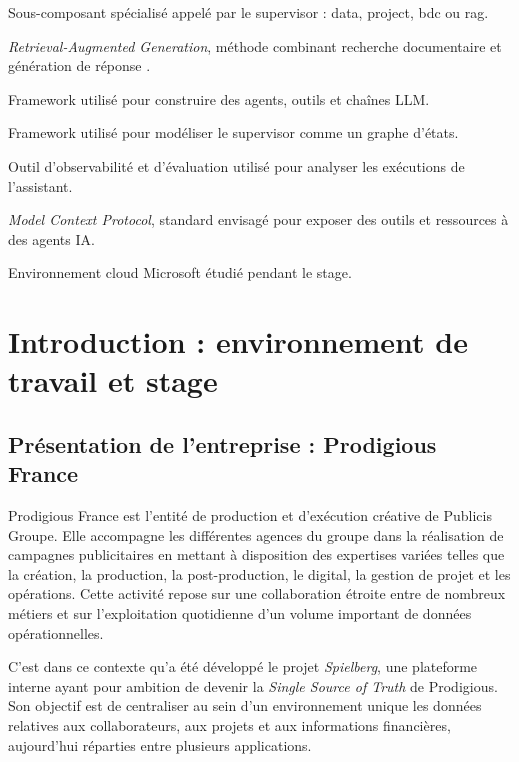 \documentclass[a4paper,11pt,english,openany]{book}
\begin{document}
\begin{description}[leftmargin=3.4cm,style=nextline,itemsep=0.28em,parsep=0pt,topsep=0.3em]
    \item[Worker] Sous-composant spécialisé appelé par le supervisor : data, project, bdc ou rag.
    \item[RAG] \textit{Retrieval-Augmented Generation}, méthode combinant recherche documentaire et génération de réponse \cite{lewis2020rag}.
    \item[LangChain] Framework utilisé pour construire des agents, outils et chaînes LLM.
    \item[LangGraph] Framework utilisé pour modéliser le supervisor comme un graphe d'états.
    \item[LangSmith] Outil d'observabilité et d'évaluation utilisé pour analyser les exécutions de l'assistant.
    \item[MCP] \textit{Model Context Protocol}, standard envisagé pour exposer des outils et ressources à des agents IA.
    \item[Azure] Environnement cloud Microsoft étudié pendant le stage.
\end{description}

\newpage
\listoffigures
{}
\tableofcontents
\newpage
{}

\chapter{Introduction : environnement de travail et stage}

\section{Présentation de l'entreprise : Prodigious France}

Prodigious France est l'entité de production et d'exécution créative de Publicis Groupe. Elle accompagne les différentes agences du groupe dans la réalisation de campagnes publicitaires en mettant à disposition des expertises variées telles que la création, la production, la post-production, le digital, la gestion de projet et les opérations. Cette activité repose sur une collaboration étroite entre de nombreux métiers et sur l'exploitation quotidienne d'un volume important de données opérationnelles.

C'est dans ce contexte qu'a été développé le projet \textit{Spielberg}, une plateforme interne ayant pour ambition de devenir la \textit{Single Source of Truth} de Prodigious. Son objectif est de centraliser au sein d'un environnement unique les données relatives aux collaborateurs, aux projets et aux informations financières, aujourd'hui réparties entre plusieurs applications.
\end{document}
